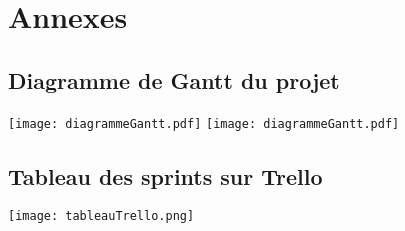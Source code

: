 \chapter{Annexes}
\section{Diagramme de Gantt du projet}
    \texttt{[image: diagrammeGantt.pdf]}
    \newpage
    \texttt{[image: diagrammeGantt.pdf]}
\section{Tableau des sprints sur Trello}
    \texttt{[image: tableauTrello.png]}